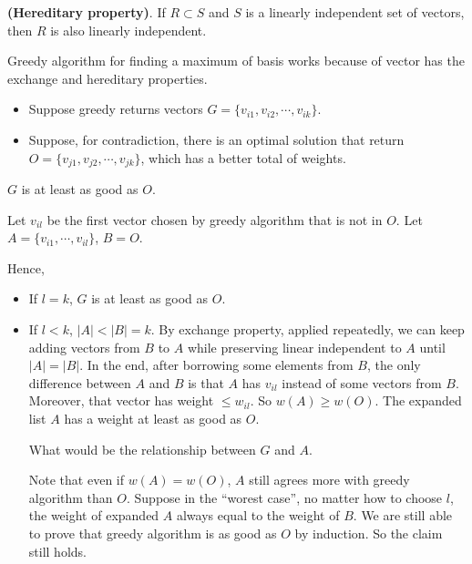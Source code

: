 \begin{theorem}
	\textbf{(Hereditary property)}. If $ R \subset S $ and $S$ is a linearly independent set of vectors, then $R$ is also linearly independent.
\end{theorem}

Greedy algorithm for finding a maximum of basis works because of vector has the exchange and hereditary properties.

\begin{itemize}
	\item Suppose greedy returns vectors $G = \{v_{i1}, v_{i2}, \cdots, v_{ik}\}$.
	\item Suppose, for contradiction, there is an optimal solution that return $O = \{v_{j1}, v_{j2}, \cdots, v_{jk} \}$, which has a better total of weights.
\end{itemize}

\begin{claim}
	$G$ is at least as good as $ O $.
\end{claim}
\begin{claimproof}
	
	Let $ v_{il} $ be the first vector chosen by greedy algorithm that is not in $O$. Let $ A = \{v_{i1}, \cdots, v_{il}\} $, $ B = O$. 
	
	Hence,
	\begin{itemize}
		\item If $ l = k $, $ G $ is at least as good as $ O $.
		\item If $ l < k $, $ |A| < |B| = k $. By exchange property, applied repeatedly, we can keep adding vectors from $ B $ to $ A $ while preserving linear independent to $ A $ until $ |A| = |B| $. In the end, after borrowing some elements from $B$, the only difference between $A$ and $B$ is that $ A $ has $ v_{il} $ instead of some vectors from $B$. Moreover, that vector has weight $ \le w_{il} $. So $ w(A) \ge w(O)$. The expanded list $A$ has a weight at least as good as $O$.
		
		What would be the relationship between $G$ and $A$.
		
		Note that even if $ w(A) = w(O) $, $ A $ still agrees more with greedy algorithm than $ O $. Suppose in the ``worest case'', no matter how to choose $l$, the weight of expanded $A$ always equal to the weight of $B$. We are still able to prove that greedy algorithm is as good as $ O $ by induction. So the claim still holds.
	\end{itemize}
	
%	
%	
\end{claimproof}





